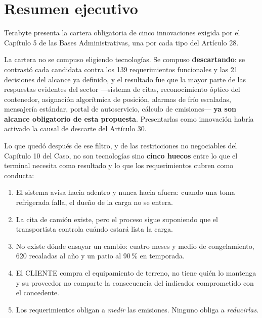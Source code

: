 \section*{Resumen ejecutivo}


Terabyte presenta la cartera obligatoria de cinco innovaciones exigida por el
Capítulo 5 de las Bases Administrativas, una por cada tipo del Artículo
28\textdegree{}.

La cartera no se compuso eligiendo tecnologías. Se compuso \textbf{descartando}: se
contrastó cada candidata contra los 139 requerimientos funcionales y las 21
decisiones del alcance ya definido, y el resultado fue que la mayor parte de
las respuestas evidentes del sector —sistema de citas, reconocimiento óptico
del contenedor, asignación algorítmica de posición, alarmas de frío
escaladas, mensajería estándar, portal de autoservicio, cálculo de emisiones—
\textbf{ya son alcance obligatorio de esta propuesta}. Presentarlas como
innovación habría activado la causal de descarte del Artículo 30\textdegree{}.

Lo que quedó después de ese filtro, y de las restricciones no negociables del
Capítulo 10 del Caso, no son tecnologías sino \textbf{cinco huecos} entre lo
que el terminal necesita como resultado y lo que los requerimientos cubren
como conducta:

\begin{enumerate}[leftmargin=*, itemsep=2pt]
  \item El sistema avisa hacia adentro y nunca hacia afuera: cuando una toma
    refrigerada falla, el dueño de la carga no se entera.
  \item La cita de camión existe, pero el proceso sigue suponiendo que el
    transportista controla cuándo estará lista la carga.
  \item No existe dónde ensayar un cambio: cuatro meses y medio de
    congelamiento, 620 recaladas al año y un patio al 90\,\% en temporada.
  \item El CLIENTE compra el equipamiento de terreno, no tiene quién lo
    mantenga y su proveedor no comparte la consecuencia del indicador
    comprometido con el concedente.
  \item Los requerimientos obligan a \emph{medir} las emisiones. Ninguno
    obliga a \emph{reducirlas}.
\end{enumerate}

